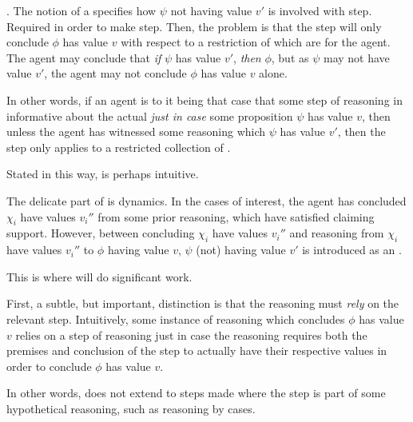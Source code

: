 \begin{note}
  \ideaCS{}.
  The notion of a \requ{} specifies how \(\psi\) not having value \(v'\) is involved with step.
  Required in order to make step.
  Then, the problem is that the step will only conclude \(\phi\) has value \(v\) with respect to a restriction of  which are \epVAd{} for the agent.
  The agent may conclude that \emph{if} \(\psi\) has value \(v'\), \emph{then} \(\phi\), but as \(\psi\) may not have value \(v'\), the agent may not conclude \(\phi\) has value \(v\) alone.

  In other words, if an agent is \committed{} to it being that case that some step of reasoning in informative about the actual \world{} \emph{just in case} some proposition \(\psi\) has value \(v\), then unless the agent has witnessed some reasoning which  \(\psi\) has value \(v'\), then the step only applies to a restricted collection of .
\end{note}

\begin{note}[Dynamics]
  Stated in this way, \ideaCS{} is perhaps intuitive.

  The delicate part of \ideaCS{} is dynamics.
  In the cases of interest, the agent has concluded \(\chi_{i}\) have values \(v_{i}''\) from some prior reasoning, which have satisfied claiming support.
  However, between concluding \(\chi_{i}\) have values \(v_{i}''\) and reasoning from \(\chi_{i}\) have values \(v_{i}''\) to \(\phi\) having value \(v\), \(\psi\) (not) having value \(v'\) is introduced as an \epVN{}.

  This is where \ideaCS{} will do significant work.
\end{note}

\begin{note}[Relying]
  First, a subtle, but important, distinction is that the reasoning must \emph{rely} on the relevant step.
  Intuitively, some instance of reasoning which concludes \(\phi\) has value \(v\) relies on a step of reasoning just in case the reasoning requires both the premises and conclusion of the step to actually have their respective values in order to conclude \(\phi\) has value \(v\).

  In other words, \ideaCS{} does not extend to steps made where the step is part of some hypothetical reasoning, such as reasoning by cases.
\end{note}


